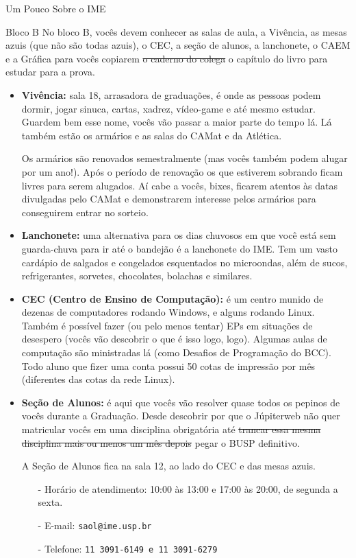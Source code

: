 \begin{secao}{Um Pouco Sobre o IME}
\begin{subsecao}{Bloco B}
No bloco B, vocês devem conhecer as salas de aula, a Vivência, as
mesas azuis (que não são todas azuis), o CEC, a seção de alunos, a lanchonete, 
o CAEM e a Gráfica para vocês copiarem \sout{o caderno do colega} o capítulo do 
livro para estudar para a prova.

\begin{itemize}
\item {\bf Vivência:} sala 18, arrasadora de graduações, é onde as pessoas podem
dormir, jogar sinuca, cartas, xadrez, vídeo-game e até
mesmo estudar. Guardem bem esse nome, vocês vão passar a maior parte do tempo lá.
Lá também estão os armários e as salas do CAMat e da Atlética.

Os armários são renovados semestralmente (mas vocês também podem alugar por um ano!). 
Após o período de renovação os que estiverem sobrando ficam livres para serem alugados. 
Aí cabe a vocês, bixes, ficarem atentos às datas divulgadas pelo CAMat e demonstrarem 
interesse pelos armários para conseguirem entrar no sorteio.

\item {\bf Lanchonete:} uma alternativa para os dias chuvosos em que você está sem
  guarda-chuva para ir até o bandejão é a lanchonete do IME. Tem um vasto
  cardápio de salgados e congelados esquentados no microondas, além de sucos,
  refrigerantes, sorvetes, chocolates, bolachas e similares.

\item {\bf CEC (Centro de Ensino de Computação):} é um centro munido de dezenas
de computadores rodando Windows, e alguns rodando Linux. Também é possível fazer
(ou pelo menos tentar) EPs em situações de desespero (vocês vão descobrir o que é
isso logo, logo). Algumas aulas de computação são ministradas lá (como Desafios
de Programação do BCC). Todo aluno que fizer uma conta possui 50 cotas de impressão
por mês (diferentes das cotas da rede Linux).

\item {\bf Seção de Alunos:} é aqui que vocês vão resolver quase todos os
pepinos de vocês durante a Graduação. Desde descobrir por que o Júpiterweb não
quer matricular vocês em uma disciplina obrigatória até \sout{trancar essa mesma
disciplina mais ou menos um mês depois} pegar o BUSP definitivo. %

A Seção de Alunos fica na sala 12, ao lado do CEC e das mesas azuis.
\begin{itemize}
\item[-] Horário de atendimento: 10:00 às 13:00 e 17:00 às 20:00, de segunda a sexta.
\item[-] E-mail: \tt{saol@ime.usp.br}
\item[-] Telefone: \tt{11 3091-6149} e \tt{11 3091-6279}
\end{itemize}


\end{itemize}
\end{subsecao}
\end{secao}
